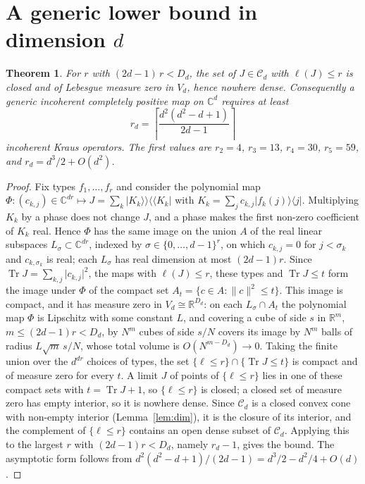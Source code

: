 \documentclass[11pt,a4paper]{article}
\newtheorem{theorem}{Theorem}
\theoremstyle{definition}
\theoremstyle{plain}
\DeclareMathOperator{\Tr}{Tr}
\newcommand{\ket}[1]{\lvert#1\rangle}
\newcommand{\bra}[1]{\langle#1\rvert}
\newcommand{\kket}[1]{\lvert#1\rangle\!\rangle}
\newcommand{\bbra}[1]{\langle\!\langle#1\rvert}
\newcommand{\norm}[1]{\lVert#1\rVert}
\newcommand{\C}{\mathbb{C}}
\newcommand{\R}{\mathbb{R}}
\begin{document}
\section{A generic lower bound in dimension \texorpdfstring{$d$}{d}}\label{sec:lower}
\begin{theorem}\label{thm:lower}
For $r$ with $(2d-1)\,r<D_d$, the set of $J\in\mathcal C_d$ with
$\ell(J)\le r$ is closed and of Lebesgue measure zero in $V_d$, hence nowhere
dense. Consequently a generic
incoherent completely positive map on $\C^d$ requires at least
\[
r_d=\left\lceil\frac{d^2(d^2-d+1)}{2d-1}\right\rceil
\]
incoherent Kraus operators. The first values are $r_2=4$, $r_3=13$,
$r_4=30$, $r_5=59$, and $r_d=d^3/2+O(d^2)$.
\end{theorem}
\begin{proof}
Fix types $f_1,\dots,f_r$ and consider the polynomial map
$\Phi:(c_{k,j})\in\C^{dr}\mapsto J=\sum_k\kket{K_k}\bbra{K_k}$ with
$K_k=\sum_jc_{k,j}\ket{f_k(j)}\bra j$. Multiplying $K_k$ by a phase does not
change $J$, and a phase makes the first non-zero coefficient of $K_k$ real.
Hence $\Phi$ has the same image on the union $A$ of the real linear subspaces
$L_\sigma\subset\C^{dr}$, indexed by $\sigma\in\{0,\dots,d-1\}^r$, on which
$c_{k,j}=0$ for $j<\sigma_k$ and $c_{k,\sigma_k}$ is real; each $L_\sigma$
has real dimension at most $(2d-1)r$. Since
$\Tr J=\sum_{k,j}\lvert c_{k,j}\rvert^2$, the maps with $\ell(J)\le r$,
these types and $\Tr J\le t$ form the image under $\Phi$ of the compact set
$A_t=\{c\in A:\norm c^2\le t\}$. This image is compact, and it has measure zero
in $V_d\cong\R^{D_d}$: on each $L_\sigma\cap A_t$ the polynomial map $\Phi$ is
Lipschitz with some constant $L$, and covering a cube of side $s$ in
$\R^m$, $m\le(2d-1)r<D_d$, by $N^m$ cubes of side $s/N$ covers its image by
$N^m$ balls of radius $L\sqrt m\,s/N$, whose total volume is
$O(N^{m-D_d})\to0$. Taking the finite union over the $d^{dr}$ choices of
types, the set $\{\ell\le r\}\cap\{\Tr J\le t\}$ is compact and of measure
zero for every $t$. A limit $J$ of points of $\{\ell\le r\}$ lies in one of
these compact sets with $t=\Tr J+1$, so $\{\ell\le r\}$ is closed; a closed set
of measure zero has empty interior, so it is nowhere dense. Since
$\mathcal C_d$ is a closed convex cone with non-empty interior
(Lemma~\ref{lem:dim}), it is the closure of its interior, and the complement
of $\{\ell\le r\}$ contains an open dense subset of $\mathcal C_d$. Applying
this to the largest $r$ with $(2d-1)r<D_d$, namely $r_d-1$, gives the bound.
The asymptotic form follows from $d^2(d^2-d+1)/(2d-1)=d^3/2-d^2/4+O(d)$.
\end{proof}
\end{document}
